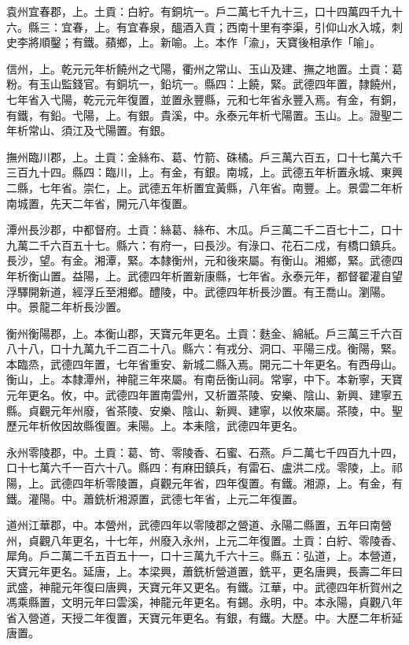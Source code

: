 \begin{pinyinscope}
 袁州宜春郡，上。土貢：白紵。有銅坑一。戶二萬七千九十三，口十四萬四千九十六。縣三：宜春，上。有宜春泉，醞酒入貢；西南十里有李渠，引仰山水入城，刺史李將順鑿；有鐵。蘋鄉，上。新喻。上。本作「渝」，天寶後相承作「喻」。



 信州，上。乾元元年析饒州之弋陽，衢州之常山、玉山及建、撫之地置。土貢：葛粉。有玉山監錢官。有銅坑一，鉛坑一。縣四：上饒，緊。武德四年置，隸饒州，七年省入弋陽，乾元元年復置，並置永豐縣，元和七年省永豐入焉。有金，有銅，有鐵，有鉛。弋陽，上。有銀。貴溪，中。永泰元年析弋陽置。玉山。上。證聖二年析常山、須江及弋陽置。有銀。



 撫州臨川郡，上。土貢：金絲布、葛、竹箭、硃橘。戶三萬六百五，口十七萬六千三百九十四。縣四：臨川，上。有金，有銀。南城，上。武德五年析置永城、東興二縣，七年省。崇仁，上。武德五年析置宜黃縣，八年省。南豐。上。景雲二年析南城置，先天二年省，開元八年復置。



 潭州長沙郡，中都督府。土貢：絲葛、絲布、木瓜。戶三萬二千二百七十二，口十九萬二千六百五十七。縣六：有府一，曰長沙。有淥口、花石二戍，有橋口鎮兵。長沙，望。有金。湘潭，緊。本隸衡州，元和後來屬。有衡山。湘鄉，緊。武德四年析衡山置。益陽，上。武德四年析置新康縣，七年省。永泰元年，都督翟灌自望浮驛開新道，經浮丘至湘鄉。醴陵，中。武德四年析長沙置。有王喬山。瀏陽。中。景龍二年析長沙置。



 衡州衡陽郡，上。本衡山郡，天寶元年更名。土貢：麩金、綿紙。戶三萬三千六百八十八，口十九萬九千二百二十八。縣六：有戎分、洞口、平陽三戍。衡陽，緊。本臨烝，武德四年置，七年省重安、新城二縣入焉。開元二十年更名。有西母山。衡山，上。本隸潭州，神龍三年來屬。有南岳衡山祠。常寧，中下。本新寧，天寶元年更名。攸，中。武德四年置南雲州，又析置茶陵、安樂、陰山、新興、建寧五縣。貞觀元年州廢，省茶陵、安樂、陰山、新興、建寧，以攸來屬。茶陵，中。聖歷元年析攸因故縣復置。耒陽。上。本耒陰，武德四年更名。



 永州零陵郡，中。土貢：葛、笴、零陵香、石蜜、石燕。戶二萬七千四百九十四，口十七萬六千一百六十八。縣四：有麻田鎮兵，有雷石、盧洪二戍。零陵，上。祁陽，上。武德四年析零陵置，貞觀元年省，四年復置。有鐵。湘源，上。有金，有鐵。灌陽。中。蕭銑析湘源置，武德七年省，上元二年復置。



 道州江華郡，中。本營州，武德四年以零陵郡之營道、永陽二縣置，五年曰南營州，貞觀八年更名，十七年，州廢入永州，上元二年復置。土貢：白紵、零陵香、犀角。戶二萬二千五百五十一，口十三萬九千六十三。縣五：弘道，上。本營道，天寶元年更名。延唐，上。本梁興，蕭銑析營道置，銑平，更名唐興，長壽二年曰武盛，神龍元年復曰唐興，天寶元年又更名。有鐵。江華，中。武德四年析賀州之馮乘縣置，文明元年曰雲溪，神龍元年更名。有錫。永明，中。本永陽，貞觀八年省入營道，天授二年復置，天寶元年更名。有銀，有鐵。大歷。中。大歷二年析延唐置。




\end{pinyinscope}
